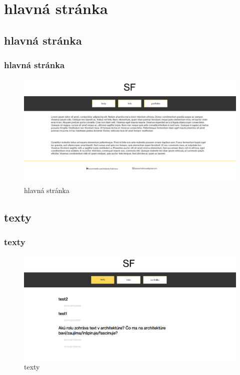 \section{hlavná stránka}
\subsection{hlavná stránka}
\label{hlavná stránka}
\begin{frame}\frametitle{hlavná stránka}
  \begin{figure}[htb]
    \centering
    \includegraphics[scale=0.3]{uvodka.png}
    \caption{hlavná stránka}
  \end{figure}

\end{frame}

\subsection{texty}
\begin{frame}\frametitle{texty}
  \begin{figure}[htb]
    \centering
    \includegraphics[scale=0.3]{texty_bez_text.png}
    \caption{texty}
  \end{figure}

\end{frame}

